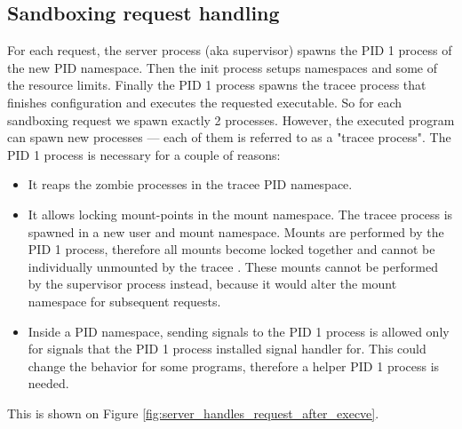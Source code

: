 \documentclass[en]{pracamgr}
\begin{document}
\subsection{Sandboxing request handling}

For each request, the server process (aka supervisor) spawns the PID 1 process of the new PID namespace. Then the init process setups namespaces and some of the resource limits. Finally the PID 1 process spawns the tracee process that finishes configuration and executes the requested executable. So for each sandboxing request we spawn exactly 2 processes. However, the executed program can spawn new processes --- each of them is referred to as a "tracee process". The PID 1 process is necessary for a couple of reasons:
\begin{itemize}
    \item It reaps the zombie processes in the tracee PID namespace.
    \item It allows locking mount-points in the mount namespace. The tracee process is spawned in a new user and mount namespace. Mounts are performed by the PID 1 process, therefore all mounts become locked together and cannot be individually unmounted by the tracee \cite{man_mount_namespaces}. These mounts cannot be performed by the supervisor process instead, because it would alter the mount namespace for subsequent requests.
    \item Inside a PID namespace, sending signals to the PID 1 process is allowed only for signals that the PID 1 process installed signal handler for. This could change the behavior for some programs, therefore a helper PID 1 process is needed.
\end{itemize}

This is shown on Figure \ref{fig:server_handles_request_after_execve}.
\end{document}
